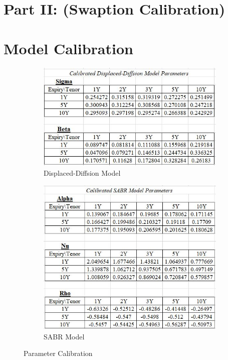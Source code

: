 \documentclass{article}
\begin{document}
\section*{Part II: (Swaption Calibration)}
\section{Model Calibration}

\begin{figure}[h]
	\centering
	\begin{subfigure}{.5\textwidth}
		\centering
		\includegraphics[width=1\linewidth]{./images/DD.jpg}
		\caption{Displaced-Diffsion Model}
		\label{fig:sub1}
	\end{subfigure}%
	\begin{subfigure}{.5\textwidth}
		\centering
		\includegraphics[width=0.7\linewidth]{./images/SABR.jpg}
		\caption{SABR Model}
		\label{fig:sub2}
	\end{subfigure}
	\caption{Parameter Calibration}
	\label{fig:test}
\end{figure}
\end{document}
